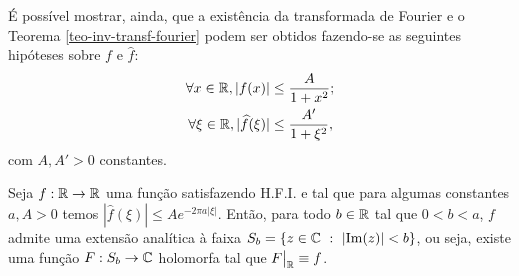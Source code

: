         É possível mostrar, ainda, que a existência da transformada de Fourier e o 
        Teorema \ref{teo-inv-transf-fourier} podem ser obtidos fazendo-se as seguintes hipóteses
        sobre $f$ e $\widehat{f}$:
        \begin{align*}
            \forall x\in\mathbb{R}, |f(x)| &\leq \frac{A}{1+x^2}; \\
            \forall \xi\in\mathbb{R}, |\widehat{f}(\xi)| &\leq \frac{A'}{1+\xi^2},
        \end{align*}
        com $A,A' > 0$ constantes.
        \begin{teorema}
        \label{teo-extensao-analitica-transf-decai-exp}
            Seja $f:\mathbb{R}\to\mathbb{R}$ uma função satisfazendo H.F.I. e tal que para algumas constantes $a,A > 0$
            temos $|\widehat{f}(\xi)| \leq Ae^{-2\pi a|\xi|}$. Então, para todo $b\in\mathbb{R}$ tal que 
            $0<b<a$, $f$ admite uma extensão analítica à faixa $S_b = \{ z\in\mathbb{C} \ : \ |\mathrm{Im}(z)| < b \}$,
            ou seja, existe uma função $F:S_b\to\mathbb{C}$ holomorfa tal que $F\big|_{\mathbb{R}} \equiv f$.
        \end{teorema}
